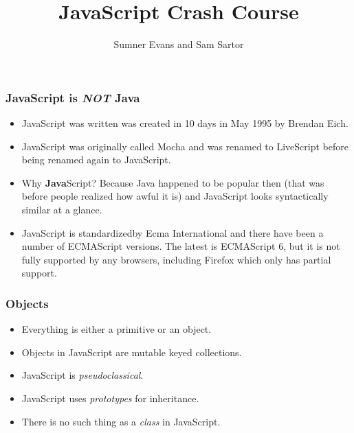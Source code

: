 \documentclass{lug}
\title{JavaScript Crash Course}
\author{Sumner Evans and Sam Sartor}
\begin{document}
\begin{frame}
    \frametitle{JavaScript is \textbf{\textit{NOT}} Java \footnotemark[1]}

    \begin{itemize}[<+->]
        \item JavaScript was written was created in 10 days in May 1995 by Brendan Eich.
        \item JavaScript was originally called Mocha and was renamed to LiveScript before being
            renamed again to JavaScript.
        \item Why \textbf{Java}Script? Because Java happened to be popular then (that was before
            people realized how awful it is) and JavaScript looks syntactically similar at a glance.
        \item JavaScript is standardized\footnotemark[2] by Ecma International and there have been a
            number of ECMAScript versions. The latest is ECMAScript 6, but it is not fully supported
            by any browsers, including Firefox which only has partial support.
    \end{itemize}

\end{frame}

\begin{frame}
    \frametitle{Objects}

    \begin{itemize}[<+->]
        \item Everything is either a primitive or an object.
        \item Objects in JavaScript are mutable keyed collections.
        \item JavaScript is \textit{pseudoclassical}.
        \item JavaScript uses \textit{prototypes} for inheritance.
        \item There is no such thing as a \textit{class} in JavaScript.\footnotemark[1]
    \end{itemize}

\end{frame}
\end{document}
